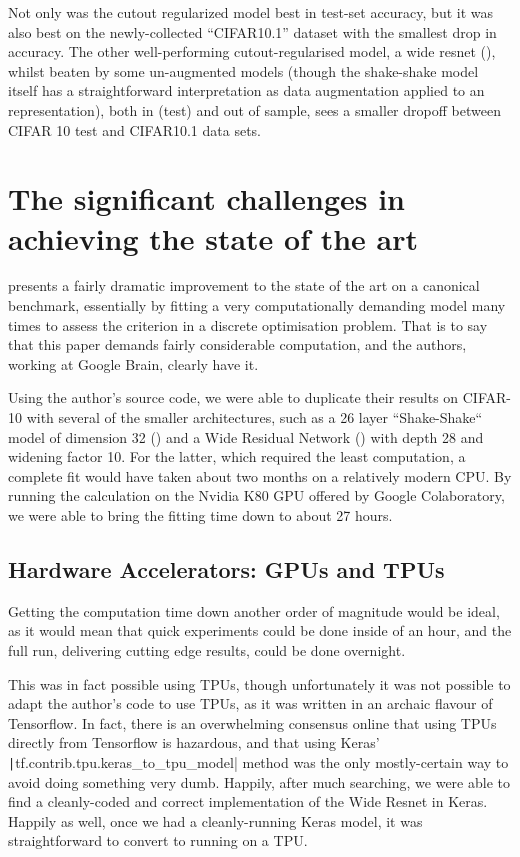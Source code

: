 \documentclass[10pt,twocolumn,letterpaper]{article}
\begin{document}
Not only was the cutout regularized model best in test-set accuracy, but it was also best on the newly-collected ``CIFAR10.1'' dataset with the smallest drop in accuracy. The other well-performing cutout-regularised model, a wide resnet (\cite{Zagoruyko2016}), whilst beaten by some un-augmented models (though the shake-shake model itself has a straightforward interpretation as data augmentation applied to an representation), both in (test) and out of sample, sees a smaller dropoff between CIFAR 10 test and CIFAR10.1 data sets. 

\section{The significant challenges in achieving the state of the art}

\cite{Cubuk2018} presents a fairly dramatic improvement to the state of the art on a canonical benchmark, essentially by fitting a very computationally demanding model many times to assess the criterion in a discrete optimisation problem. That is to say that this paper demands fairly considerable computation, and the authors, working at Google Brain, clearly have it. 

Using the author's source code, we were able to duplicate their results on CIFAR-10 with several of the smaller architectures, such as a 26 layer ``Shake-Shake`` model of dimension 32 (\cite{Gastaldi2017}) and a Wide Residual Network (\cite{Zagoruyko2016}) with depth 28 and widening factor 10.
For the latter, which required the least computation, a complete fit would have taken about two months on a relatively modern CPU. By running the calculation on the Nvidia K80 GPU offered by Google Colaboratory, we were able to bring the fitting time down to about 27 hours.

\subsection{Hardware Accelerators: GPUs and TPUs}
Getting the computation time down another order of magnitude would be ideal, as it would mean that quick experiments could be done inside of an hour, and the full run, delivering cutting edge results, could be done overnight.

This was in fact possible using TPUs, though unfortunately it was not possible to adapt the \cite{Cubuk2018} author's code to use TPUs, as it was written in an archaic flavour of Tensorflow. In fact, there is an overwhelming consensus online that using TPUs directly from Tensorflow is hazardous, and that using Keras' \texttt|tf.contrib.tpu.keras\_to\_tpu\_model| method was the only mostly-certain way to avoid doing something very dumb. Happily, after much searching, we were able to find a cleanly-coded and correct implementation of the Wide Resnet in Keras. Happily as well, once we had a cleanly-running Keras model, it was straightforward to convert to running on a TPU.
\end{document}

